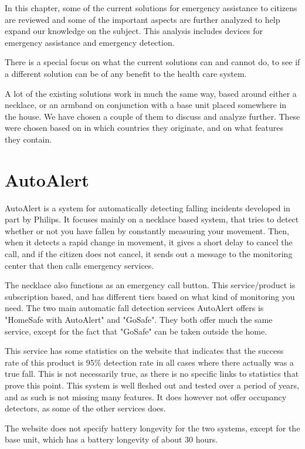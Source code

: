 \label{sec:existing_solutions}
In this chapter, some of the current solutions for emergency assistance to citizens are reviewed and some of the important aspects are further analyzed to help expand our knowledge on the subject. This analysis includes devices for emergency assistance and emergency detection.

There is a special focus on what the current solutions can and cannot do, to see if a different solution can be of any benefit to the health care system.

A lot of the existing solutions work in much the same way, based around either a necklace, or an armband on conjunction with a base unit placed somewhere in the house. We have chosen a couple of them to discuss and analyze further. These were chosen based on in which countries they originate, and on what features they contain. 


\section{AutoAlert}
AutoAlert \cite{AAlert} is a system for automatically detecting falling incidents developed in part by Philips. It focuses mainly on a necklace based system, that tries to detect whether or not you have fallen by constantly measuring your movement. Then, when it detects a rapid change in movement, it gives a short delay to cancel the call, and if the citizen does not cancel, it sends out a message to the monitoring center that then calls emergency services.

The necklace also functions as an emergency call button.
This service/product is subscription based, and has different tiers based on what kind of monitoring you need. The two main automatic fall detection services AutoAlert offers is "HomeSafe with AutoAlert" and "GoSafe". They both offer much the same service, except for the fact that "GoSafe" can be taken outside the home. 

This service has some statistics on the website that indicates that the success rate of this product is 95\% \cite{AAlert:homesafe}  detection rate in all cases where there actually was a true fall. This is not necessarily true, as there is no specific links to statistics that prove this point.
This system is well fleshed out and tested over a period of years, and as such is not missing many features. It does however not offer occupancy detectors, as some of the other services does.

The website does not specify battery longevity for the two systems, except for the base unit, which has a battery longevity of about 30 hours.

